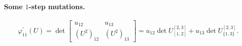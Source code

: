 \paragraph{Some $1$-step mutations.} 
\begin{equation}
    \varphi_{11}^\prime(U) = \det \begin{bmatrix} u_{12} & u_{13}\\ (U^2)_{12} & (U^2)_{13}\end{bmatrix} = u_{12} \det U_{[1,2]}^{[2,3]} + u_{13} \det U_{\{1,3\}}^{[2,3]}.
\end{equation}